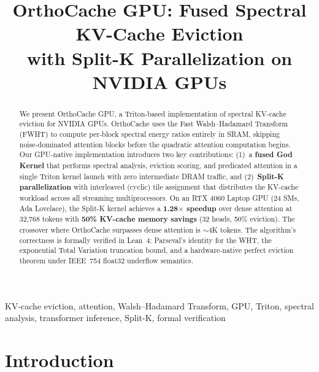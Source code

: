 \documentclass[conference]{IEEEtran}
\begin{document}
\title{OrthoCache GPU: Fused Spectral KV-Cache Eviction\\with Split-K Parallelization on NVIDIA GPUs}

\author{
}

\maketitle

\begin{abstract}
We present OrthoCache GPU, a Triton-based implementation of spectral
KV-cache eviction for NVIDIA GPUs. OrthoCache uses the Fast Walsh--Hadamard
Transform (FWHT) to compute per-block spectral energy ratios entirely in
SRAM, skipping noise-dominated attention blocks before the quadratic
attention computation begins. Our GPU-native implementation introduces
two key contributions: (1)~a \textbf{fused God Kernel} that performs
spectral analysis, eviction scoring, and predicated attention in a
single Triton kernel launch with zero intermediate DRAM traffic, and
(2)~\textbf{Split-K parallelization} with interleaved (cyclic) tile
assignment that distributes the KV-cache workload across all streaming
multiprocessors. On an RTX 4060 Laptop GPU (24 SMs, Ada Lovelace),
the Split-K kernel achieves a \textbf{1.28$\times$ speedup} over
dense attention at 32,768 tokens with \textbf{50\% KV-cache memory
savings} (32 heads, 50\% eviction). The crossover where OrthoCache
surpasses dense attention is $\sim$4K tokens. The algorithm's
correctness is formally verified in Lean~4: Parseval's identity for
the WHT, the exponential Total Variation truncation bound, and a
hardware-native perfect eviction theorem under IEEE~754 float32
underflow semantics.
\end{abstract}

\begin{IEEEkeywords}
KV-cache eviction, attention, Walsh--Hadamard Transform, GPU, Triton,
spectral analysis, transformer inference, Split-K, formal verification
\end{IEEEkeywords}

\section{Introduction}\label{sec:intro}
\end{document}
